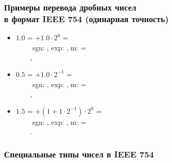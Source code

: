 \begin{frame}
\frametitle{Примеры перевода дробных чисел\\в формат IEEE 754 (одинарная точность)}
\begin{itemize}\itemsep=.5cm
    \item $1.0$ = \pause $+ 1.0 \cdot 2^0$ = \pause
        \\$\qquad$
            sgn: , exp: , m:  = \pause
        \\$\qquad$,
    \item \pause $0.5$ = \pause
        $+ 1.0 \cdot 2^{-1}$ = \pause
        \\$\qquad$
            sgn: , exp: , m:  = \pause
        \\$\qquad$,
    \item \pause $1.5$ = \pause
        $+ (1 + 1\cdot2^{-1} ) \cdot 2^0$ =\pause
        \\$\qquad$
            sgn: , exp: , m:  = \pause
        \\$\qquad$.
\end{itemize}
\end{frame}

\begin{frame}
\frametitle{Специальные типы чисел в IEEE 754}
\end{frame}


